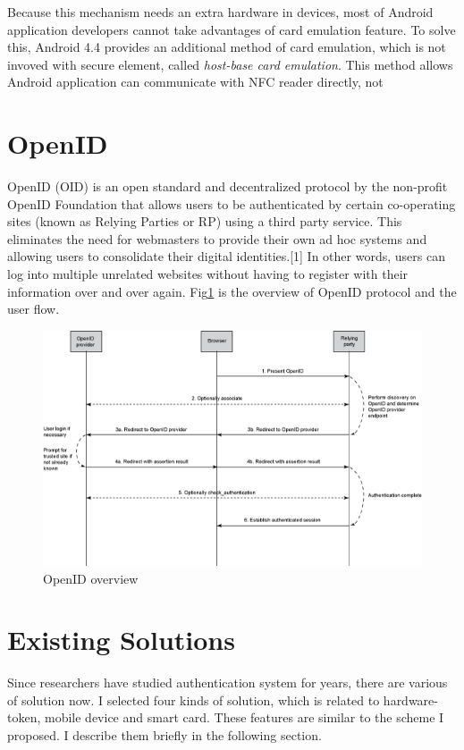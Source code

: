 \begin{CJK}{Bg5}{bsmi}
Because this mechanism needs an extra hardware in devices, most of Android application developers cannot take advantages of card emulation feature. To solve this, Android 4.4 provides an additional method of card emulation, which is not invoved with secure element, called \emph{host-base card emulation}. This method allows Android application can communicate with NFC reader directly, not 

\section{OpenID}

OpenID (OID) is an open standard and decentralized protocol by the non-profit OpenID Foundation that allows users to be authenticated by certain co-operating sites (known as Relying Parties or RP) using a third party service. This eliminates the need for webmasters to provide their own ad hoc systems and allowing users to consolidate their digital identities.[1] In other words, users can log into multiple unrelated websites without having to register with their information over and over again. Fig\ref{fig:openid-flow} is the overview of OpenID protocol and the user flow.
\begin{figure}
\centering
\label{fig:openid-flow}
\includegraphics[scale=0.6]{picture/openid-flow.png}
\caption{OpenID overview}
\end{figure}

\section{Existing Solutions}

Since researchers have studied authentication system for years, there are various of solution now. I selected four kinds of solution, which is related to hardware-token, mobile device and smart card. These features are similar to the scheme I proposed. I describe them briefly in the following section.


\end{CJK}

